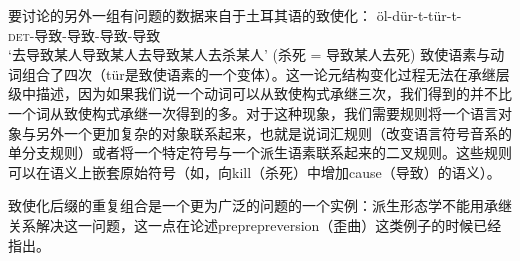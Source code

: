 要讨论的另外一组有问题的数据来自于土耳其语的致使化\citep[]{Lewis67a-u}：
\ea
\gll öl-dür-t-tür-t- \\
\textsc{det}-导致-导致-导致-导致\\
\glt `去导致某人导致某人去导致某人去杀某人'
(杀死 = 导致某人去死)
\z
致使语素与动词组合了四次（tür是致使语素的一个变体）。这一论元结构变化过程无法在承继层级中描述，因为如果我们说一个动词可以从致使构式承继三次，我们得到的并不比一个词从致使构式承继一次得到的多。对于这种现象，我们需要规则将一个语言对象与另外一个更加复杂的对象联系起来，也就是说词汇规则（改变语言符号音系的单分支规则）或者将一个特定符号与一个派生语素联系起来的二叉规则。这些规则可以在语义上嵌套原始符号（如，向kill（杀死）中增加cause（导致）的语义）。

致使化后缀的重复组合是一个更为广泛的问题的一个实例：派生形态学不能用承继关系解决这一问题，这一点\citet{KN93a}在论述preprepreversion（歪曲）这类例子的时候已经指出。

